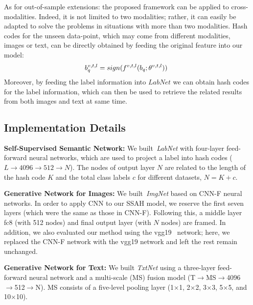 \documentclass[10pt,twocolumn,letterpaper]{article}
\begin{document}
As for out-of-sample extensions: the proposed framework can be applied to cross-modalities. Indeed, it is not limited to two modalities; rather, it can easily be adapted to solve the problems in situations with more than two modalities. Hash codes for the unseen data-point, which may come from different modalities, images or text, can be directly obtained by feeding the original feature into our model:
\begin{equation}
\label{eq:generateImgHash}
\begin{aligned}
b_{q}^{ v,t,l} = sign(f^{ v,t,l}(b_{q}; \theta^{ v,t,l}))\
\end{aligned}
\vspace{-0.1cm}
\end{equation}
Moreover, by feeding the label information into $LabNet$ we can obtain hash codes for the label information, which can then be used to retrieve the related results from both images and text at same time.
\vspace{-0.2cm}
\subsection{Implementation Details}
\vspace{-0.15cm}
\label{section:Implementation Details}
\textbf{Self-Supervised Semantic Network:} We built~\emph{LabNet} with four-layer feed-forward neural networks, which are used to project a label into hash codes ($L\rightarrow 4096 \rightarrow 512 \rightarrow N$). The nodes of output layer $N$ are related to the length of the hash code $K$ and the total class labels $c$ for different datasets, $N=K+c$.

\textbf{Generative Network for Images:} We built~\emph{ImgNet} based on CNN-F \cite{chatfield2014return} neural networks. In order to apply CNN to our SSAH model, we reserve the first seven layers (which were the same as those in CNN-F). Following this, a middle layer fc8 (with 512 nodes) and final output layer (with $N$ nodes) are framed. In addition, we also evaluated our method using the vgg19~\cite{simonyan2014very} network; here, we replaced the CNN-F network with the vgg19 network and left the rest remain unchanged.

\textbf{Generative Network for Text:} We built \emph{TxtNet} using a three-layer feed-forward neural network and a multi-scale (MS) fusion model (T$\rightarrow$MS$\rightarrow$4096$\rightarrow$512$\rightarrow$N). MS consists of a five-level pooling layer (1$\times$1, 2$\times$2, 3$\times$3, 5$\times$5, and 10$\times$10).
\end{document}
